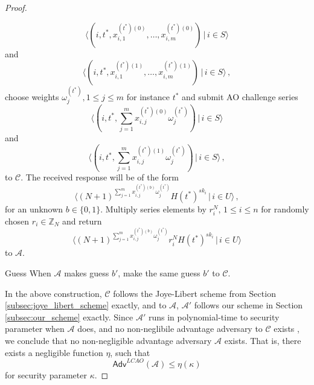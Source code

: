 \documentclass[10pt,journal,compsoc]{IEEEtran}
\theoremstyle{definition}
\theoremstyle{definition}
\theoremstyle{remark}
\begin{document}
\begin{proof}
\begin{LaTeXdescription}
\begin{equation*}
            \langle(i,t^*,x^{(t^*)(0)}_{i,1},\dots,x^{(t^*)(0)}_{i,m})\,|\,i \in S\rangle
        \end{equation*}
        and
        \begin{equation*}
            \langle(i,t^*,x^{(t^*)(1)}_{i,1},\dots,x^{(t^*)(1)}_{i,m})\,|\, i \in S\rangle\,,
        \end{equation*}
        choose weights $\omega^{(t^*)}_j,1 \leq j \leq m$ for instance $t^*$ and submit AO challenge series
        \begin{equation*}
            \langle(i,t^*,\sum^m_{j=1}x^{(t^*)(0)}_{i,j}\omega^{(t^*)}_j)\,|\,i \in S\rangle
        \end{equation*}
        and
        \begin{equation*}
            \langle(i,t^*,\sum^m_{j=1}x^{(t^*)(1)}_{i,j}\omega^{(t^*)}_j)\,|\,i \in S\rangle\,,
        \end{equation*}
        to $\mathcal{C}$. The received response will be of the form 
        \begin{equation*}
            \langle(N+1)^{\sum^m_{j=1}x^{(t^*)(b)}_{i,j}\omega^{(t^*)}_j}H(t^*)^{sk_i}\,|\,i\in U\rangle\,,
        \end{equation*}
        for an unknown $b \in \{0,1\}$. Multiply series elements by $r_i^N,\,1 \leq i \leq n$ for randomly chosen $r_i \in \mathbb{Z}_N$ and return
        \begin{equation*}
            \langle(N+1)^{\sum^m_{j=1}x^{(t^*)(b)}_{i,j}\omega^{(t^*)}_j}r_i^N H(t^*)^{sk_i}\,|\,i\in U\rangle
        \end{equation*}
        to $\mathcal{A}$.
        \item[Guess] When $\mathcal{A}$ makes guess $b'$, make the same guess $b'$ to $\mathcal{C}$.
    \end{LaTeXdescription}

    In the above construction, $\mathcal{C}$ follows the Joye-Libert scheme from Section \ref{subsec:joye_libert_scheme} exactly, and to $\mathcal{A}$, $\mathcal{A}'$ follows our scheme in Section \ref{subsec:our_scheme} exactly. Since $\mathcal{A}'$ runs in polynomial-time to security parameter when $\mathcal{A}$ does, and no non-neglibile advantage adversary to $\mathcal{C}$ exists \cite{joyeScalableSchemePrivacyPreserving2013}, we conclude that no non-negligible advantage adversary $\mathcal{A}$ exists. That is, there exists a negligible function $\eta$, such that
    \begin{equation*}
        \mathsf{Adv}^{LCAO}(\mathcal{A}) \leq \eta(\kappa)
    \end{equation*}
    for security parameter $\kappa$.
\end{proof}
\end{document}
